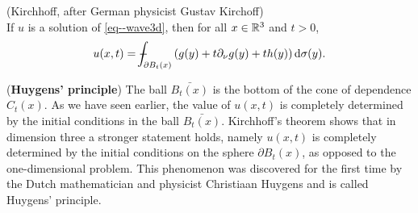 \documentclass[11pt]{article}
\begin{document}
				\begin{thm}
					(Kirchhoff, after German physicist Gustav Kirchoff)\\
					If $u$ is a solution of \eqref{eq--wave3d}, then for all $x\in\mathbb{R}^3$ and $t>0$,
					\begin{equation*}
						u(x,t)=\dashint_{\partial B_t(x)}\left(g(y)+t\partial_\nu g(y)+th(y)\right)\mathrm{d}\sigma(y).
					\end{equation*}
				\end{thm}

				\begin{remark}({\bf{Huygens' principle}})
					The ball $\bar{B_t(x)}$ is the bottom of the cone of dependence $C_t(x)$. As we have seen earlier, the value of $u(x,t)$ is completely determined by the initial conditions in the ball $\bar{B_t(x)}$. Kirchhoff's theorem shows that in dimension three a stronger statement holds, namely $u(x,t)$ is completely determined by the initial conditions on the sphere $\partial B_t(x)$, as opposed to the one-dimensional problem. This phenomenon was discovered for the first time by the Dutch mathematician and physicist Christiaan Huygens and is called Huygens' principle.
				\end{remark}
\end{document}
